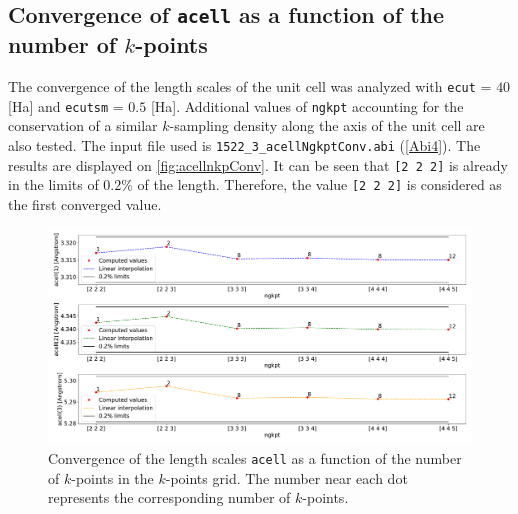 \documentclass[11pt,a4paper]{article}
\begin{document}
\subsection{Convergence of \texttt{acell} as a function of the number of $k$-points}
The convergence of the length scales of the unit cell was analyzed with \texttt{ecut} = $40$ [Ha] and \texttt{ecutsm} = $0.5$ [Ha]. Additional values of \texttt{ngkpt} accounting for the conservation of a similar $k$-sampling density along the axis of the unit cell are also tested. The input file used is \texttt{1522\_3\_acellNgkptConv.abi} (\autoref{Abi4}). The results are displayed on \autoref{fig:acellnkpConv}. It can be seen that \texttt{[2 2 2]} is already in the limits of $0.2\%$ of the length. Therefore, the value \texttt{[2 2 2]} is considered as the first converged value.
\begin{figure}
\centering
\includegraphics[width=\textwidth]{images/acellNgkpt.pdf}
\caption{Convergence of the length scales \texttt{acell} as a function of the number of $k$-points in the $k$-points grid.
The number near each dot represents the corresponding number of $k$-points.}
\label{fig:acellnkpConv}
\end{figure}
\end{document}
